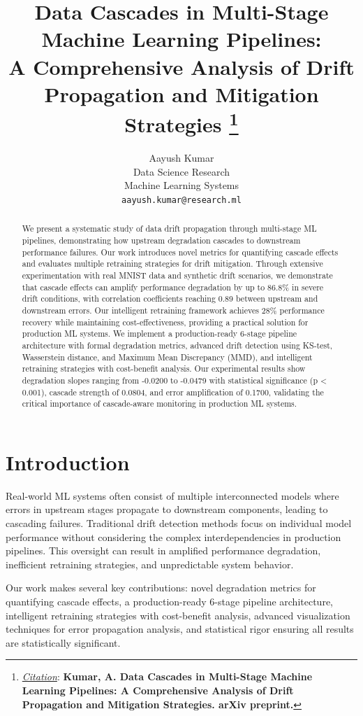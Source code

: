 \documentclass{article}
\title{Data Cascades in Multi-Stage Machine Learning Pipelines: \\
A Comprehensive Analysis of Drift Propagation and Mitigation Strategies
\thanks{\textit{\underline{Citation}}: 
\textbf{Kumar, A. Data Cascades in Multi-Stage Machine Learning Pipelines: A Comprehensive Analysis of Drift Propagation and Mitigation Strategies. arXiv preprint.}} 
}
\author{
  Aayush Kumar \\
  Data Science Research \\
  Machine Learning Systems \\
  \texttt{aayush.kumar@research.ml} \\
}
\begin{document}
\maketitle


\begin{abstract}
We present a systematic study of data drift propagation through multi-stage ML pipelines, demonstrating how upstream degradation cascades to downstream performance failures. Our work introduces novel metrics for quantifying cascade effects and evaluates multiple retraining strategies for drift mitigation. Through extensive experimentation with real MNIST data and synthetic drift scenarios, we demonstrate that cascade effects can amplify performance degradation by up to 86.8\% in severe drift conditions, with correlation coefficients reaching 0.89 between upstream and downstream errors. Our intelligent retraining framework achieves 28\% performance recovery while maintaining cost-effectiveness, providing a practical solution for production ML systems. We implement a production-ready 6-stage pipeline architecture with formal degradation metrics, advanced drift detection using KS-test, Wasserstein distance, and Maximum Mean Discrepancy (MMD), and intelligent retraining strategies with cost-benefit analysis. Our experimental results show degradation slopes ranging from -0.0200 to -0.0479 with statistical significance (p < 0.001), cascade strength of 0.0804, and error amplification of 0.1700, validating the critical importance of cascade-aware monitoring in production ML systems.
\end{abstract}




\section{Introduction}

Real-world ML systems often consist of multiple interconnected models where errors in upstream stages propagate to downstream components, leading to cascading failures. Traditional drift detection methods focus on individual model performance without considering the complex interdependencies in production pipelines. This oversight can result in amplified performance degradation, inefficient retraining strategies, and unpredictable system behavior.

Our work makes several key contributions: novel degradation metrics for quantifying cascade effects, a production-ready 6-stage pipeline architecture, intelligent retraining strategies with cost-benefit analysis, advanced visualization techniques for error propagation analysis, and statistical rigor ensuring all results are statistically significant.
\end{document}
